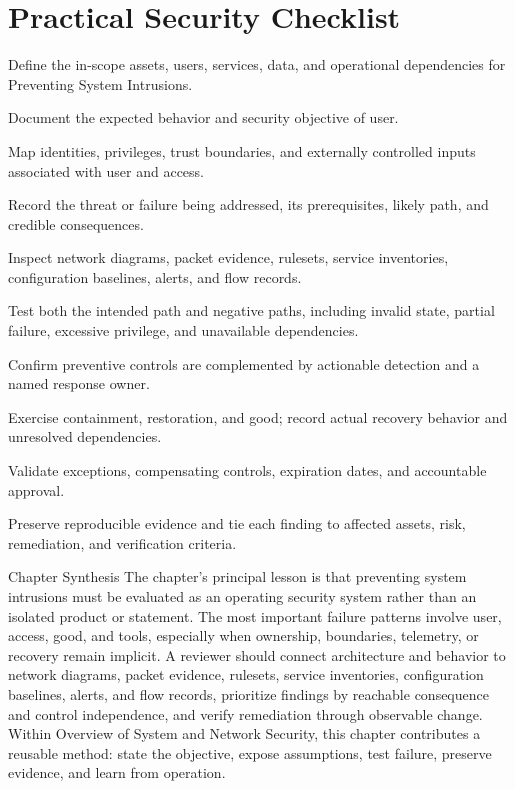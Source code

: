 \documentclass[11pt,letterpaper]{article}
\begin{document}
\section*{Practical Security Checklist}
\begin{CornellChecklist}
\item Define the in-scope assets, users, services, data, and operational dependencies for Preventing System Intrusions.
\item Document the expected behavior and security objective of user.
\item Map identities, privileges, trust boundaries, and externally controlled inputs associated with user and access.
\item Record the threat or failure being addressed, its prerequisites, likely path, and credible consequences.
\item Inspect network diagrams, packet evidence, rulesets, service inventories, configuration baselines, alerts, and flow records.
\item Test both the intended path and negative paths, including invalid state, partial failure, excessive privilege, and unavailable dependencies.
\item Confirm preventive controls are complemented by actionable detection and a named response owner.
\item Exercise containment, restoration, and good; record actual recovery behavior and unresolved dependencies.
\item Validate exceptions, compensating controls, expiration dates, and accountable approval.
\item Preserve reproducible evidence and tie each finding to affected assets, risk, remediation, and verification criteria.
\end{CornellChecklist}
\begin{CornellSummaryBox}{Chapter Synthesis}
The chapter's principal lesson is that preventing system intrusions must be evaluated as an operating security system rather than an isolated product or statement. The most important failure patterns involve user, access, good, and tools, especially when ownership, boundaries, telemetry, or recovery remain implicit. A reviewer should connect architecture and behavior to network diagrams, packet evidence, rulesets, service inventories, configuration baselines, alerts, and flow records, prioritize findings by reachable consequence and control independence, and verify remediation through observable change. Within Overview of System and Network Security, this chapter contributes a reusable method: state the objective, expose assumptions, test failure, preserve evidence, and learn from operation.
\end{CornellSummaryBox}
\end{document}
